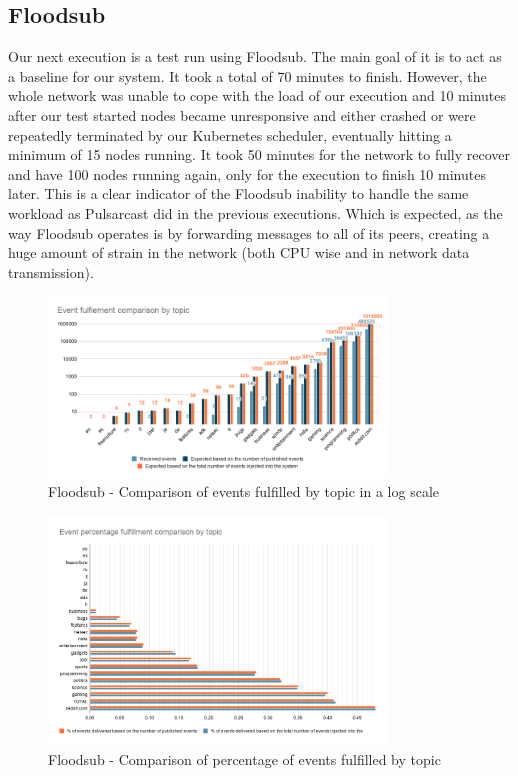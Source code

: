 \subsection{Floodsub}\label{subsec:floodsub}

Our next execution is a test run using Floodsub. The main goal of it is to act
as a baseline for our system. It took a total of 70 minutes to finish. However,
the whole network was unable to cope with the load of our execution and 10
minutes after our test started nodes became unresponsive and either crashed or
were repeatedly terminated by our Kubernetes scheduler, eventually hitting a
minimum of 15 nodes running. It took 50 minutes for the network to fully
recover and have 100 nodes running again, only for the execution to finish 10
minutes later. This is a clear indicator of the Floodsub inability to handle
the same workload as Pulsarcast did in the previous executions. Which is
expected, as the way Floodsub operates is by forwarding messages to all of its
peers, creating a huge amount of strain in the network (both CPU wise and in
network data transmission).

\begin{figure}[!htb]
  \centering
  \includegraphics[width=0.8\textwidth]{../images/graph-floodsub-event-fulfillment-comparison.png}
  \caption{Floodsub - Comparison of events fulfilled by topic in a log scale}
  \label{fig:graph-floodsub-event-fulfillment-comparison}
\end{figure}

\begin{figure}[!htb]
  \centering
  \includegraphics[width=0.8\textwidth]{../images/graph-floodsub-event-percentage-fulfillment-comparison.png}
  \caption{Floodsub - Comparison of percentage of events fulfilled by topic}
  \label{fig:graph-floodsub-event-percentage-fulfillment-comparison}
\end{figure}


